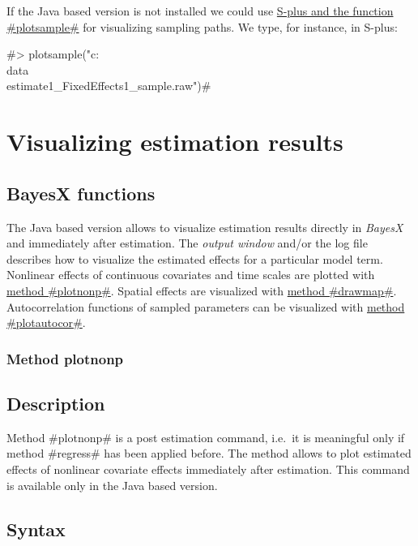 If the Java based version is not installed we could use
\hyperref[splusplotsample]{S-plus and the function #plotsample#}
for visualizing sampling paths. We type, for instance, in S-plus:


#> plotsample("c:\\data\\estimate1_FixedEffects1_sample.raw")#


\section{Visualizing estimation results}
\label{visresults} 

\subsection{BayesX functions}
\label{bayesxplot}

The Java based version allows to visualize estimation results
directly in {\em BayesX} and immediately after estimation. The
{\em output window} and/or the log file describes how to visualize
the estimated effects for a particular model term. Nonlinear
effects of continuous covariates and time scales are plotted with
\hyperref[bayesregplotnonp]{method #plotnonp#}. Spatial effects
are visualized with \hyperref[bayesregdrawmap]{method #drawmap#}.
Autocorrelation functions of sampled parameters can be visualized
with \hyperref[bayesregplotautocor]{method #plotautocor#}.

\subsubsection{Method plotnonp}
\label{bayesregplotnonp} 

\subsection*{Description}

Method #plotnonp# is a post estimation command, i.e.~it is
meaningful only if method #regress# has been applied before. The
method allows to plot estimated effects of nonlinear covariate
effects immediately after estimation. This command is available
only in the Java based version.

\subsection*{Syntax}

